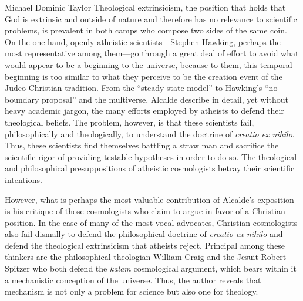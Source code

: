 \begin{recengenv}{Michael Dominic Taylor}
Theological extrinsicism, the position that holds that God is extrinsic and outside of nature and therefore has no relevance to scientific problems, is prevalent in both camps who compose two sides of the same coin. On the one hand, openly atheistic scientists---Stephen Hawking, perhaps the most representative among them---go through a great deal of effort to avoid what would appear to be a beginning to the universe, because to them, this temporal beginning is too similar to what they perceive to be the creation event of the Judeo-Christian tradition. From the ``steady-state model'' to Hawking's ``no boundary proposal'' and the multiverse, Alcalde describe in detail, yet without heavy academic jargon, the many efforts employed by atheists to defend their theological beliefs. The problem, however, is that these scientists fail, philosophically and theologically, to understand the doctrine of \textit{creatio ex nihilo}. Thus, these scientists find themselves battling a straw man and sacrifice the scientific rigor of providing testable hypotheses in order to do so. The theological and philosophical presuppositions of atheistic cosmologists betray their scientific intentions.

However, what is perhaps the most valuable contribution of Alcalde's exposition is his critique of those cosmologists who claim to argue in favor of a Christian position. In the case of many of the most vocal advocates, Christian cosmologists also fail dismally to defend the philosophical doctrine of \textit{creatio ex nihilo} and defend the theological extrinsicism that atheists reject. Principal among these thinkers are the philosophical theologian William Craig and the Jesuit Robert Spitzer who both defend the \textit{kalam} cosmological argument, which bears within it a mechanistic conception of the universe. Thus, the author reveals that mechanism is not only a problem for science but also one for theology.


\end{recengenv}
